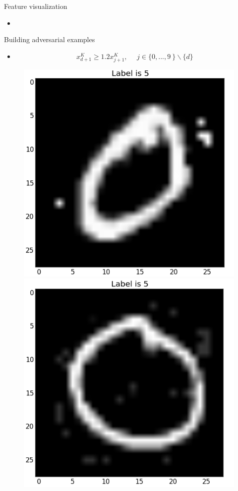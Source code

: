 \documentclass{beamer}
\begin{document}
\begin{frame}{Feature visualization}
  \begin{itemize}
  \item
  \end{itemize}
\end{frame}

\begin{frame}{Building adversarial examples}
  \begin{itemize}
  \item $$x_{d+1}^{K} \geq 1.2 x_{j+1}^{K},\ \ \ \ \ \ j \in \{0, ..., 9\ \} \backslash \{d \}$$
  \end{itemize}
\end{frame}

\begin{frame}
  \begin{figure}
    \centering
    \includegraphics[width=0.48\columnwidth]{0-free.png}
    \includegraphics[width=0.48\columnwidth]{0-limited.png}
  \end{figure}
\end{frame}
\end{document}
